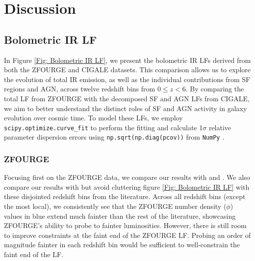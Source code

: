 \section{Discussion} \label{Sec: Discussion}
\subsection{Bolometric IR LF} \label{Sec: Bolometric IR LF}

In Figure \ref{Fig: Bolometric IR LF}, we present the bolometric IR LFs derived from both the ZFOURGE and CIGALE datasets. This comparison allows us to explore the evolution of total IR emission, as well as the individual contributions from SF regions and AGN, across twelve redshift bins from $0 \leq z < 6$. By comparing the total LF from ZFOURGE with the decomposed SF and AGN LFs from CIGALE, we aim to better understand the distinct roles of SF and AGN activity in galaxy evolution over cosmic time. To model these LFs, we employ \texttt{scipy.optimize.curve\_fit} \citep{virtanen_scipy_2020} to perform the fitting and calculate 1$\sigma$ relative parameter dispersion errors using \texttt{np.sqrt(np.diag(pcov))} from \texttt{NumPy} \citep{harris_array_2020}. 

\subsubsection{ZFOURGE}
Focusing first on the ZFOURGE data, we compare our results with \cite{rodighiero_mid-_2010} and \cite{gruppioni_herschel_2013}. We also compare our results with \cite{fu_decomposing_2010, huang_local_2007, caputi_infrared_2007} but avoid cluttering figure \ref{Fig: Bolometric IR LF} with these disjointed redshift bins from the literature. Across all redshift bins (except the most local), we consistently see that the ZFOURGE number density ($\phi$) values in blue extend much fainter than the rest of the literature, showcasing ZFOURGE's ability to probe to fainter luminosities. However, there is still room to improve constraints at the faint end of the ZFOURGE LF. Probing an order of magnitude fainter in each redshift bin would be sufficient to well-constrain the faint end of the LF.


